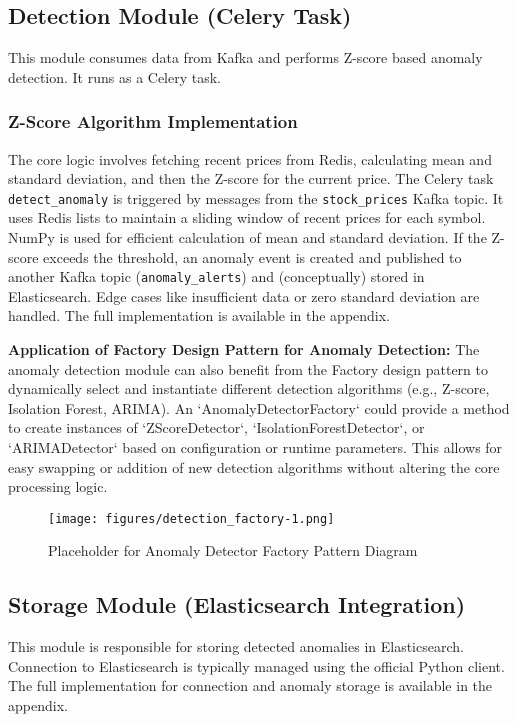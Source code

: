 \subsection{Detection Module (Celery Task)}

This module consumes data from Kafka and performs Z-score based anomaly detection. It runs as a Celery task.

\subsubsection{Z-Score Algorithm Implementation}
The core logic involves fetching recent prices from Redis, calculating mean and standard deviation, and then the Z-score for the current price. The Celery task \texttt{detect\_anomaly} is triggered by messages from the \texttt{stock\_prices} Kafka topic. It uses Redis lists to maintain a sliding window of recent prices for each symbol. NumPy is used for efficient calculation of mean and standard deviation. If the Z-score exceeds the threshold, an anomaly event is created and published to another Kafka topic (\texttt{anomaly\_alerts}) and (conceptually) stored in Elasticsearch. Edge cases like insufficient data or zero standard deviation are handled. The full implementation is available in the appendix.

\textbf{Application of Factory Design Pattern for Anomaly Detection:}
The anomaly detection module can also benefit from the Factory design pattern to dynamically select and instantiate different detection algorithms (e.g., Z-score, Isolation Forest, ARIMA). An `AnomalyDetectorFactory` could provide a method to create instances of `ZScoreDetector`, `IsolationForestDetector`, or `ARIMADetector` based on configuration or runtime parameters. This allows for easy swapping or addition of new detection algorithms without altering the core processing logic.
\begin{figure}[H]
    \centering
    \texttt{[image: figures/detection\_factory-1.png]}
    \caption{Placeholder for Anomaly Detector Factory Pattern Diagram}
    \label{fig:anomaly_detector_factory_diagram}
\end{figure}

\subsection{Storage Module (Elasticsearch Integration)}

This module is responsible for storing detected anomalies in Elasticsearch. Connection to Elasticsearch is typically managed using the official Python client. The full implementation for connection and anomaly storage is available in the appendix.

